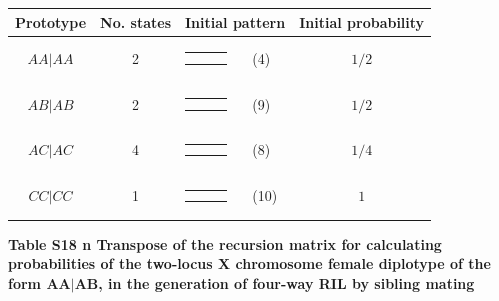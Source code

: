 \documentclass[9pt,letterpaper,twoside]{article}
\begin{document}
{
\begin{center}
\begin{tabular}{ccrlc} \hline
Prototype & No. states & \multicolumn{2}{c}{Initial pattern} & Initial probability \\ \hline
$AA|AA$ & 2 & 
{\renewcommand{\arraystretch}{0.3}
\renewcommand{\tabcolsep}{0.5mm}
\parbox[b][3mm][c]{12mm}{
\begin{tabular}{|p{2mm}|p{2mm}||p{2mm}|} \hline
$\bullet$ &           &           \\
$\bullet$ &           &           \\ \hline
\end{tabular}}}
& (4) & $1/2$ \\
$AB|AB$ & 2 & 
{\renewcommand{\arraystretch}{0.3}
\renewcommand{\tabcolsep}{0.5mm}
\parbox[b][3mm][c]{12mm}{
\begin{tabular}{|p{2mm}|p{2mm}||p{2mm}|} \hline
$\bullet$ &           &           \\
          & $\bullet$ &           \\ \hline
\end{tabular}}}
& (9) & $1/2$ \\
$AC|AC$ & 4 & 
{\renewcommand{\arraystretch}{0.3}
\renewcommand{\tabcolsep}{0.5mm}
\parbox[b][3mm][c]{12mm}{
\begin{tabular}{|p{2mm}|p{2mm}||p{2mm}|} \hline
$\bullet$ &           &           \\
          &           & $\bullet$ \\ \hline
\end{tabular}}}
& (8) & $1/4$ \\
$CC|CC$ & 1 & 
{\renewcommand{\arraystretch}{0.3}
\renewcommand{\tabcolsep}{0.5mm}
\parbox[b][3mm][c]{12mm}{
\begin{tabular}{|p{2mm}|p{2mm}||p{2mm}|} \hline
          &           & $\bullet$ \\
          &           & $\bullet$ \\ \hline
\end{tabular}}}
& (10) & $1$ \\
\hline
\end{tabular}
\end{center}
}

\newpage

\noindent \textbf{Table S18 {\color{white} n} Transpose of the recursion matrix for
calculating probabilities of the two-locus X chromosome female diplotype of the form $\boldsymbol{AA|AB}$, 
in the generation of four-way RIL by sibling mating}
\end{document}
